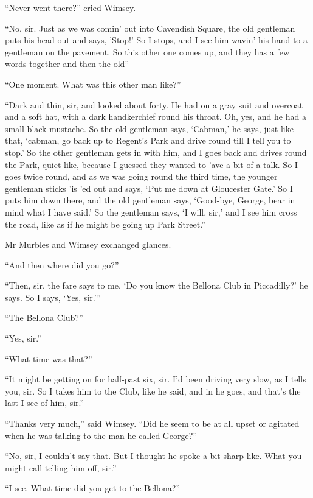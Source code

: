 \enquote{Never went there?} cried Wimsey.

\enquote{No, sir. Just as we was comin' out into Cavendish Square, the old gentleman puts his head out and says, 'Stop!' So I stops, and I see him wavin' his hand to a gentleman on the pavement. So this other one comes up, and they has a few words together and then the old\longdash}

\enquote{One moment. What was this other man like?}

\enquote{Dark and thin, sir, and looked about forty. He had on a gray suit and overcoat and a soft hat, with a dark handkerchief round his throat. Oh, yes, and he had a small black mustache. So the old gentleman says, \enquote{Cabman,} he says, just like that, \enquote{cabman, go back up to Regent's Park and drive round till I tell you to stop.} So the other gentleman gets in with him, and I goes back and drives round the Park, quiet-like, because I guessed they wanted to 'ave a bit of a talk. So I goes twice round, and as we was going round the third time, the younger gentleman sticks 'is 'ed out and says, \enquote{Put me down at Gloucester Gate.} So I puts him down there, and the old gentleman says, \enquote{Good-bye, George, bear in mind what I have said.} So the gentleman says, \enquote{I will, sir,} and I see him cross the road, like as if he might be going up Park Street.}

Mr Murbles and Wimsey exchanged glances.

\enquote{And then where did you go?}

\enquote{Then, sir, the fare says to me, \enquote{Do you know the Bellona Club in Piccadilly?} he says. So I says, \enquote{Yes, sir.}}

\enquote{The Bellona Club?}

\enquote{Yes, sir.}

\enquote{What time was that?}

\enquote{It might be getting on for half-past six, sir. I'd been driving very slow, as I tells you, sir. So I takes him to the Club, like he said, and in he goes, and that's the last I see of him, sir.}

\enquote{Thanks very much,} said Wimsey. \enquote{Did he seem to be at all upset or agitated when he was talking to the man he called George?}

\enquote{No, sir, I couldn't say that. But I thought he spoke a bit sharp-like. What you might call telling him off, sir.}

\enquote{I see. What time did you get to the Bellona?}

